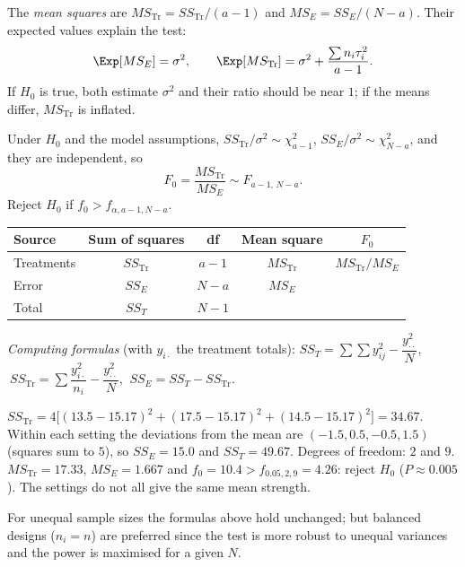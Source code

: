 The \emph{mean squares} are $MS_{\mathrm{Tr}}=SS_{\mathrm{Tr}}/(a-1)$ and $MS_E=SS_E/(N-a)$. Their expected values explain the test:
\[ \Exp[MS_E]=\sigma^2,\qquad\Exp[MS_{\mathrm{Tr}}]=\sigma^2+\frac{\sum n_i\tau_i^2}{a-1}. \]
If $H_0$ is true, both estimate $\sigma^2$ and their ratio should be near $1$; if the means differ, $MS_{\mathrm{Tr}}$ is inflated.

\begin{theorem}\label{thm:anova-F}
Under $H_0$ and the model assumptions, $SS_{\mathrm{Tr}}/\sigma^2\sim\chi^2_{a-1}$, $SS_E/\sigma^2\sim\chi^2_{N-a}$, and they are independent, so
\[ F_0=\frac{MS_{\mathrm{Tr}}}{MS_E}\sim F_{a-1,\,N-a}. \]
Reject $H_0$ if $f_0>f_{\alpha,a-1,N-a}$.
\end{theorem}

\begin{center}
\begin{tabular}{lcccc}
\toprule
Source & Sum of squares & df & Mean square & $F_0$ \\
\midrule
Treatments & $SS_{\mathrm{Tr}}$ & $a-1$ & $MS_{\mathrm{Tr}}$ & $MS_{\mathrm{Tr}}/MS_E$ \\
Error & $SS_E$ & $N-a$ & $MS_E$ & \\
Total & $SS_T$ & $N-1$ & & \\
\bottomrule
\end{tabular}
\end{center}

\emph{Computing formulas} (with $y_{i\cdot}$ the treatment totals): $SS_T=\sum\sum y_{ij}^2-\dfrac{y_{\cdot\cdot}^2}N$, $\ SS_{\mathrm{Tr}}=\sum\dfrac{y_{i\cdot}^2}{n_i}-\dfrac{y_{\cdot\cdot}^2}N$, $\ SS_E=SS_T-SS_{\mathrm{Tr}}$.

\begin{example}\label{ex:anovacalc}
$SS_{\mathrm{Tr}}=4\big[(13.5-15.17)^2+(17.5-15.17)^2+(14.5-15.17)^2\big]=34.67$. Within each setting the deviations from the mean are $(-1.5,0.5,-0.5,1.5)$ (squares sum to $5$), so $SS_E=15.0$ and $SS_T=49.67$. Degrees of freedom: $2$ and $9$. $MS_{\mathrm{Tr}}=17.33$, $MS_E=1.667$ and $f_0=10.4>f_{0.05,2,9}=4.26$: reject $H_0$ ($P\approx0.005$). The settings do not all give the same mean strength.
\end{example}

For unequal sample sizes the formulas above hold unchanged; but balanced designs ($n_i=n$) are preferred since the test is more robust to unequal variances and the power is maximised for a given $N$.


